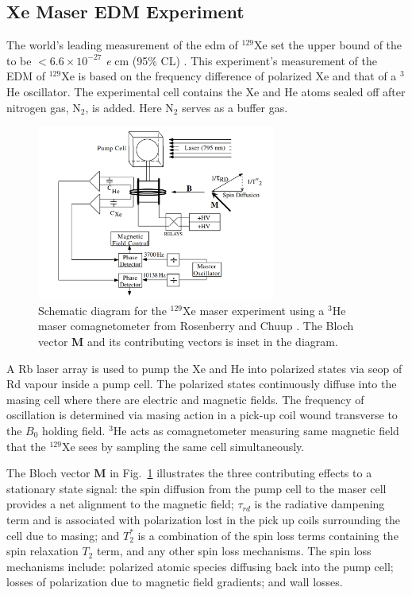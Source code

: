 \subsection{Xe Maser EDM Experiment}

The world's leading measurement of the \gls{edm} of $^{129}$Xe set the upper bound of the to be $< 6.6 \times 10^{-27}$ \textit{e} cm (95\% CL) \cite{Rosenberry2001}. This experiment's measurement of the EDM of $^{129}$Xe is based on the frequency difference of polarized Xe and that of a $^3$He oscillator. The experimental cell contains the Xe and He atoms sealed off after nitrogen gas, N$_2$, is added. Here N$_2$ serves as a buffer gas. 

\begin{figure} [h!]
	\center
		\includegraphics[width=0.7\textwidth]{MaserXeExperiment.png}
	\caption { Schematic diagram for the $^{129}$Xe maser experiment using a $^3$He maser comagnetometer from Rosenberry and Chuup \cite{Rosenberry2001}. The Bloch vector \textbf{M} and its contributing vectors is inset in the diagram. }
		\label{fig:Maser}
\end{figure}

A Rb laser array is used to pump the Xe and He into polarized states via \gls{seop} of Rd vapour inside a pump cell. The polarized states continuously diffuse into the masing cell where there are electric and magnetic fields. The frequency of oscillation is determined via masing action in a pick-up coil wound transverse to the $B_0$ holding field. $^3$He acts as comagnetometer measuring same magnetic field that the $^{129}$Xe sees by sampling the same cell simultaneously.

The Bloch vector \textbf{M} in Fig.~\ref{fig:Maser} illustrates the three contributing effects to a stationary state signal: the spin diffusion from the pump cell to the maser cell provides a net alignment to the magnetic field; $\tau_{rd}$ is the radiative dampening term and is associated with polarization lost in the pick up coils surrounding the cell due to masing; and $T_2^*$ is a combination of the  spin loss terms containing the spin relaxation $T_2$ term, and any other spin loss mechanisms. The spin loss mechanisms include: polarized atomic species diffusing back into the pump cell; losses of polarization due to magnetic field gradients; and wall losses. 

